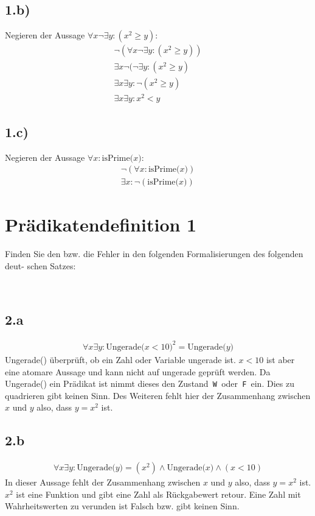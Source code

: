 \documentclass[10pt,ngerman]{scrartcl}
\newcommand{\w }{\texttt{ W }}
\newcommand{\f }{\texttt{ F }}
\begin{document}
\subsection{1.b)}
Negieren der Aussage $\forall x \neg \exists y : (x^2 \geq y)$:
\setcounter{equation}{0}
\begin{align}
\neg(\forall x \neg \exists y : (x^2 \geq y))\\
\exists x \neg(\neg \exists y : (x^2 \geq y)\\
\exists x \exists y : \neg (x^2 \geq y)\\
\exists x \exists y : x^2 < y
\end{align}
\subsection{1.c)}
Negieren der Aussage $\forall x : \text{isPrime(}x\text{)}$:
\setcounter{equation}{0}
\begin{align}
\neg(\forall x : \text{isPrime(}x\text{)})\\
\exists x :\neg(\text{isPrime(}x\text{)})
\end{align}
\pagebreak
\section{Prädikatendefinition 1}
Finden Sie den bzw. die Fehler in den folgenden Formalisierungen des folgenden deut-
schen Satzes:
\setcounter{equation}{0}
\begin{center}
\\
\end{center}
\subsection{2.a}
\setcounter{equation}{0}
\begin{align*}
\forall x \exists y: \text{Ungerade(}x < 10\text{)}^2 = \text{Ungerade(}y\text{)}
\end{align*}
Ungerade() überprüft, ob ein Zahl oder Variable ungerade ist. $x<10$ ist aber eine atomare Aussage und kann nicht auf ungerade geprüft werden. Da Ungerade() ein Prädikat ist nimmt dieses den Zustand\w oder\f ein. Dies zu quadrieren gibt keinen Sinn. Des Weiteren fehlt hier der Zusammenhang zwischen $x$ und $y$ also, dass $y = x^2$ ist.
\subsection{2.b}
\setcounter{equation}{0}
\begin{align*}
\forall x \exists y: \text{Ungerade(}y\text{)} = (x^2) \wedge \text{Ungerade(}x\text{)} \wedge (x < 10)
\end{align*}
In dieser Aussage fehlt der Zusammenhang zwischen $x$ und $y$ also, dass $y = x^2$ ist. $x^2$ ist eine Funktion und gibt eine Zahl als Rückgabewert retour. Eine Zahl mit Wahrheitswerten zu \glqq verunden\grqq{}  ist Falsch bzw. gibt keinen Sinn.
\end{document}
